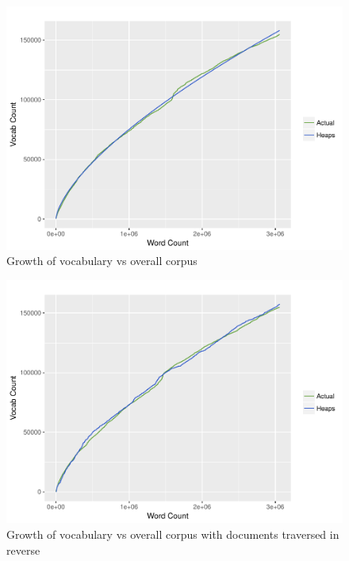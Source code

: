 \documentclass[letterpaper,11pt]{article}
\begin{document}
   \begin{figure}[h]
  \centering
  \includegraphics[scale=0.7]{corpusGrowth.pdf}
  \caption{Growth of vocabulary vs overall corpus}
  \label{fig:q2p1}
  \end{figure}
  
   \begin{figure}[h]
  \centering
  \includegraphics[scale=0.7]{corpusGrowthReverse.pdf}
  \caption{Growth of vocabulary vs overall corpus with documents traversed in reverse}
  \label{fig:q2p2}
  \end{figure}

\clearpage

\end{document}
